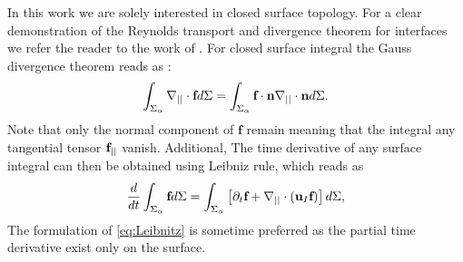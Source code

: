 In this work we are solely interested in closed surface topology. 
For a clear demonstration of the Reynolds transport and divergence theorem for interfaces we refer the reader to the work of \citet{nadim1996concise}. 
For closed surface integral the Gauss divergence theorem reads as :
\begin{equation}
    \int_{\Sigma_\alpha}  \mathbf{\nabla}_{||}\cdot \textbf{f} d\Sigma
    = 
    \int_{\Sigma_\alpha}  \textbf{f} \cdot \textbf{n}\mathbf{\nabla}_{||}\cdot\textbf{n} d\Sigma. 
    \label{eq:surf_div_theorem}
\end{equation}
Note that only the normal component of $\textbf{f}$ remain meaning that the integral any tangential tensor $\textbf f_{||}$ vanish. 
Additional, The time derivative of any surface integral can then be obtained using Leibniz rule, which reads as  
\begin{equation}
    \frac{d}{dt} \int_{\Sigma_\alpha} \textbf{f} d\Sigma 
    = \int_{\Sigma_\alpha} \left[
        \partial_t \textbf{f} 
        +   \mathbf{\nabla}_{||}\cdot (\textbf{u}_I\textbf{f})
    \right]d\Sigma,
    \label{eq:Leibnitz}
\end{equation}
The formulation of \ref{eq:Leibnitz} is sometime preferred as the partial time derivative exist only on the surface. 

